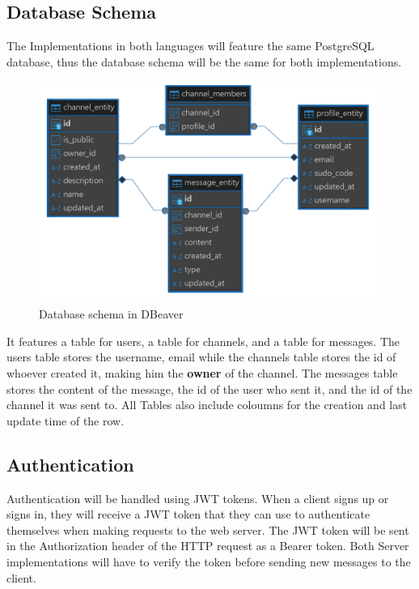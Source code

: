 \documentclass[a4paper,12pt]{article}
\begin{document}
	\newpage
	\subsection{Database Schema}
	\label{subsec:database_schema}
	The Implementations in both languages will feature the same PostgreSQL database, thus the database schema will 
	be the same for both implementations.
	\begin{figure}[h]
		\centering
		\includegraphics[width=\textwidth]{dbeaver_database_representation.png}
		\caption{Database schema in DBeaver}
		\label{fig:dbeaver_database_representation}
	\end{figure}

	It features a table for users, a table for channels, and a table for messages. The users table stores the username, email
	while the channels table stores the id of whoever created it, making him the \textbf{owner} of the channel. The messages table
	stores the content of the message, the id of the user who sent it, and the id of the channel it was sent to. All Tables also
	include coloumns for the creation and last update time of the row.

	\subsection{Authentication}
	\label{subsec:authentication}
	Authentication will be handled using JWT tokens. When a client signs up or signs in, they will receive a JWT token that
	they can use to authenticate themselves when making requests to the web server. The JWT token will be sent in the 
	Authorization header of the HTTP request as a Bearer token. Both Server implementations will have to verify the token 
	before sending new messages to the client.
\end{document}
